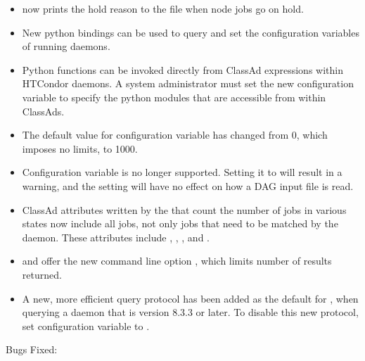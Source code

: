 \begin{itemize}
\item {} now prints the hold reason to the 
file when node jobs go on hold.

\item New python bindings can be used to query and set the 
configuration variables of running daemons.

\item Python functions can be invoked directly from ClassAd expressions 
within HTCondor daemons.  
A system administrator must set the new configuration variable
to specify the python modules that are accessible from within ClassAds.

\item The default value for configuration variable 
 has changed from 0, 
which imposes no limits, to 1000.

\item Configuration variable 
is no longer supported.  
Setting it to  will result in a warning, 
and the setting will have no effect on how a DAG input file is read.

\item ClassAd attributes written by the  that
count the number of jobs in various states now include all jobs, 
not only jobs that need to be matched by the  daemon.
These attributes include , ,
, and .

\item {} and  offer the new command line option 
, 
which limits number of results returned.

\item A new, more efficient query protocol has been added as the default 
for ,
when querying a  daemon that is version 8.3.3 or later. 
To disable this new protocol, set configuration variable
 to .

\end{itemize}

\noindent Bugs Fixed:

